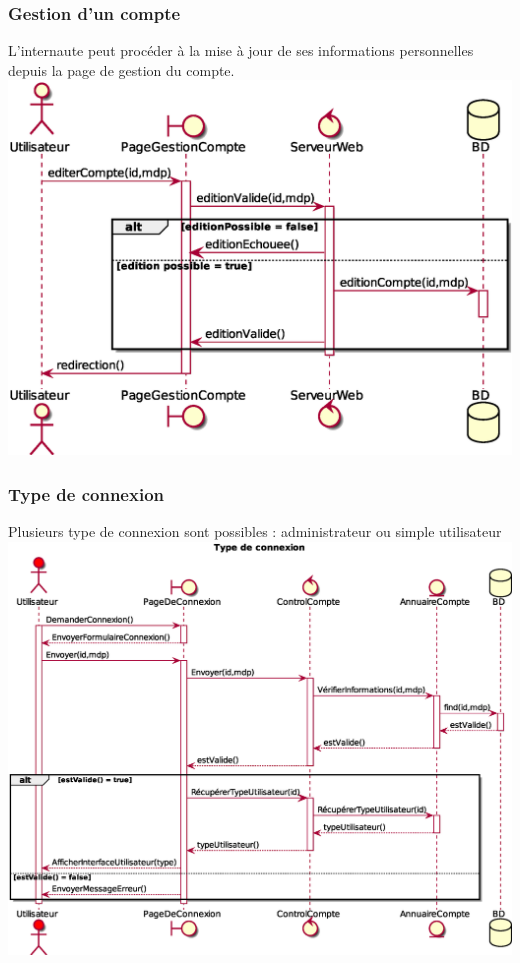 \subsubsection{Gestion d'un compte}
L'internaute peut procéder à la mise à jour de ses informations personnelles depuis la page de gestion du compte.\\
\includegraphics[width=17cm]{Images/DSEQ_GestionCompte} \\
\newpage
\subsubsection{Type de connexion}
Plusieurs type de connexion sont possibles : administrateur ou simple utilisateur \\
\includegraphics[width=17cm]{Images/DSEQ_TypeConnexion} \\
\newpage
